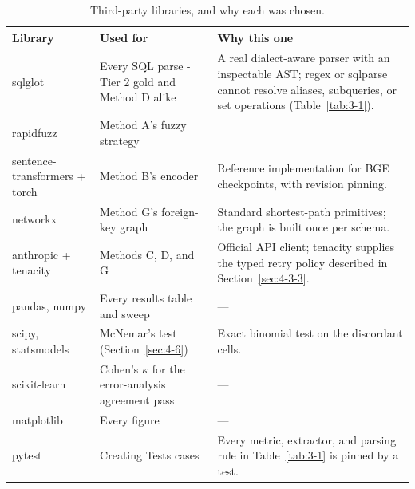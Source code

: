 \begin{table}[htbp]
\centering
\caption{Third-party libraries, and why each was chosen.}\label{tab:D-2}
\setlength{\tabcolsep}{6pt}
\begin{tabular}{@{}>{\raggedright\arraybackslash}p{}>{\raggedright\arraybackslash}p{}>{\raggedright\arraybackslash}p{}@{}}
\toprule
\textbf{Library} & \textbf{Used for} & \textbf{Why this one}\tabularnewline
\midrule
sqlglot & Every SQL parse - Tier 2 gold and Method D alike & A real dialect-aware parser with an inspectable AST; regex or sqlparse cannot resolve aliases, subqueries, or set operations (Table~\ref{tab:3-1}).\tabularnewline
rapidfuzz & Method A's fuzzy strategy &\tabularnewline
sentence-transformers + torch & Method B's encoder & Reference implementation for BGE checkpoints, with revision pinning.\tabularnewline
networkx & Method G's foreign-key graph & Standard shortest-path primitives; the graph is built once per schema.\tabularnewline
anthropic + tenacity & Methods C, D, and G & Official API client; tenacity supplies the typed retry policy described in Section~\ref{sec:4-3-3}.\tabularnewline
pandas, numpy & Every results table and sweep & ---\tabularnewline
scipy, statsmodels & McNemar's test (Section~\ref{sec:4-6}) & Exact binomial test on the discordant cells.\tabularnewline
scikit-learn & Cohen's \ensuremath{\kappa} for the error-analysis agreement pass & ---\tabularnewline
matplotlib & Every figure & ---\tabularnewline
pytest & Creating Tests cases & Every metric, extractor, and parsing rule in Table~\ref{tab:3-1} is pinned by a test.\tabularnewline
\bottomrule
\end{tabular}
\end{table}
